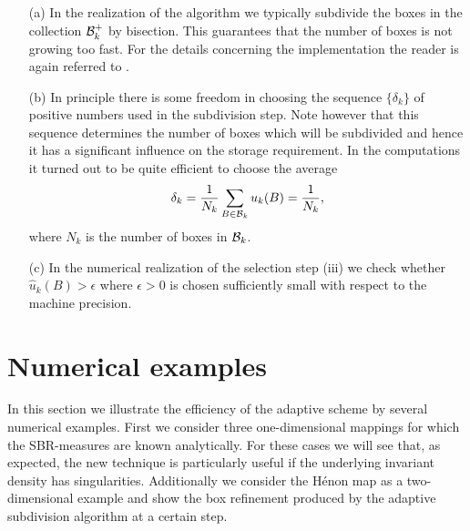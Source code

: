 \documentclass[cvs,envcountsect]{svjour}
\begin{document}
\begin{remark}\label{rmk:real}
\begin{itemize}
\item[(a)] In the realization of the algorithm we typically subdivide the
boxes in the collection $\cB_k^+$ by bisection.  This guarantees that
the number of boxes is not growing too fast.  For the details concerning the
implementation the reader is again referred to \cite{DH1,DJ:96}.
\item[(b)] In principle there is some freedom in choosing the sequence
$\{\delta_k\}$ of positive numbers used in the subdivision step. Note however
that this sequence determines the number of boxes which will be subdivided
and hence it has a significant influence on the storage requirement.
In the computations it turned out to be quite efficient to choose the
average
\[
\delta_k = {1\over N_k}\sum_{B\in\cB_k} u_k(B) = {1\over N_k},
\]
where $N_k$ is the number of boxes in $\cB_k$.
\item[(c)] In the numerical realization of the selection step (iii)
we check whether $\hat u_k(B) > \epsilon$ where $\epsilon>0$ is chosen
sufficiently small with respect to the machine precision.
\end{itemize}
\end{remark}


\section{Numerical examples}
\label{sec:num}
%
In this section we illustrate the efficiency of the adaptive scheme by
several numerical examples.  First we consider three one-dimensional
mappings for which the SBR-mea\-sures are known analytically.  For these
cases we
will see that, as expected, the new technique is particularly useful
if the underlying invariant density has singularities.  Additionally we
consider the H\'{e}non map as a two-dimensional
example and show the box refinement produced
by the adaptive subdivision algorithm at a certain step.
\end{document}
